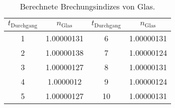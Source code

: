 \begin{table}
  \centering
  \caption{Berechnete Brechungsindizes von Glas.}
  \label{tabular_03}
  \begin{tabular}{c c | c c}
    \toprule
   \multicolumn{1}{c}{$t_\text{Durchgang}$} & \multicolumn{1}{c}{$n_\text{Glas}$} & \multicolumn{1}{c}{$t_\text{Durchgang}$} & \multicolumn{1}{c}{$n_\text{Glas}$}\\
   \midrule
    \num{1} & \num{1.00000131} & \num{6 } & \num{1.00000131} \\
    \num{2} & \num{1.00000138} & \num{7 } & \num{1.00000124} \\
    \num{3} & \num{1.00000127} & \num{8 } & \num{1.00000131} \\
    \num{4} & \num{1.0000012 } & \num{9 } & \num{1.00000124} \\
    \num{5} & \num{1.00000127} & \num{10} & \num{1.00000131} \\
\bottomrule
  \end{tabular}
\end{table}
